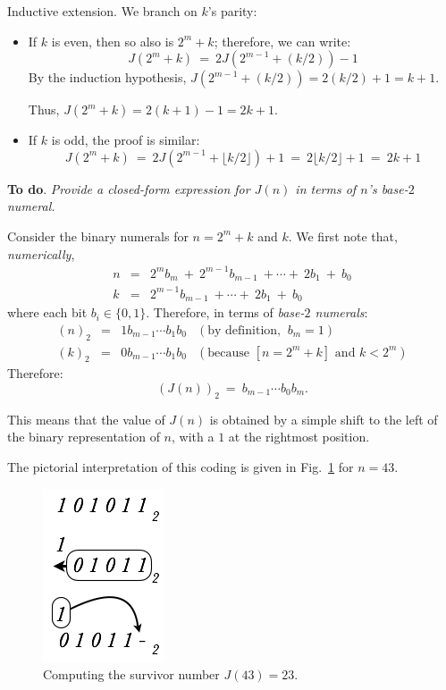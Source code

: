 \begin{itemize}
\begin{itemize}
{\sf Inductive extension}.
We branch on $k$'s parity:
\begin{itemize}
\item If $k$ is even, then so also is $2^m+k$; therefore, we can write:
\[ J(2^m+k) \ = \ 2J(2^{m-1}+(k/2))-1 \]
By the induction hypothesis, $J(2^{m-1} + (k/2)) = 2(k/2) +1 = k+1$.

Thus, $J(2^m+k) = 2(k+1) -1 = 2k+1$.

\item 
If $k$ is odd, the proof is similar:
\[ J(2^m+k) \ = \ 2J(2^{m-1}+\lfloor k/2 \rfloor)+1 \ = \ 2\lfloor k/2 \rfloor +1 \ = \ 2k+1 \]
\end{itemize}

\end{itemize}

\medskip

{\bf To do}. {\em Provide a closed-form expression for $J(n)$ in terms of $n$'s base-$2$ numeral.}

\medskip

Consider the binary numerals for $n = 2^m +k$ and $k$.  We first note that, {\em numerically},
\begin{eqnarray*}
n & = & 2^m b_m \ + \ 2^{m-1} b_{m-1} \ + \cdots + \ 2 b_1 \ + \ b_0 \\
k & = & 2^{m-1}  b_{m-1} \ + \cdots + \ 2 b_1 \ + \ b_0
\end{eqnarray*} 
where each bit $b_i \in \{0,1\}$.  Therefore, in terms of {\em base-$2$ numerals}:
\[ \begin{array}{ccrl}
(n)_2 & = & 1 b_{m-1} \cdots b_1 b_0 & (\mbox{by definition, } \ b_m=1) \\ 
(k)_2 & = & 0 b_{m-1} \cdots b_1 b_0 & (\mbox{because } [n = 2^m +k] \mbox{ and } k < 2^m)
\end{array}
\]
Therefore:
\[ (J(n))_2 \ = \ b_{m-1} \cdots b_0 b_m. \]

This means that the value of $J(n)$ is obtained by a simple shift to the left of the binary representation of $n$, with a $1$ at the rightmost position.

\smallskip

The pictorial interpretation of this coding is given in Fig.~\ref{fig:josephusCoding} for $n=43$.
\begin{figure}[htb]
\begin{center}
        \includegraphics[scale=0.35]{FiguresMaths/josephusCoding}
        \caption{Computing the survivor number $J(43)=23$.}
        \label{fig:josephusCoding}
\end{center}
\end{figure}
\end{itemize}

